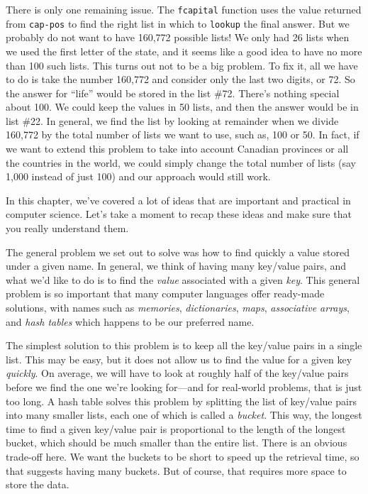 There is only one remaining issue.  The \texttt{fcapital} function uses the
value returned from \texttt{cap-pos} to find the right list in which to
\texttt{lookup} the final answer. But we probably do not want to have 
160,772 possible lists! We only had 26 lists when we used the first letter
of the state, and it seems like a good idea to have no more than 100
such lists. This turns out not to be a big problem. To fix it, all we
have to do is take the number 160,772 and consider only the last two digits,
or 72. So the answer for ``life'' would be stored in the list \#72. There's
nothing special about 100. We could keep the values in 50 lists, and then
the answer would be in list \#22. In general, we find the list by looking at
remainder when we divide 160,772 by the total number of lists we want to use,
such as, 100 or 50. In fact, if we want to extend this problem to take into
account Canadian provinces or all the countries in the world, we could simply
change the total number of lists (say 1,000 instead of just 100) and our
approach would still work.

In this chapter, we've covered a lot of ideas that are important and practical
in computer science. Let's take a moment to recap these ideas and make sure
that you really understand them.

The general problem we set out to solve was how to find quickly a value
stored under a given name. In general, we think of having many key/value pairs,
and what we'd like to do is to find the \emph{value} associated with a given 
\emph{key}. This general problem is so important that many computer languages
offer ready-made solutions, with names such as \emph{memories}, \emph{dictionaries}, 
\emph{maps}, \emph{associative arrays}, and \emph{hash tables} which happens to 
be our preferred name.

The simplest solution to this problem is to keep all the key/value pairs in a 
single list. This may be easy, but it does not allow us to find the value for
a given key \emph{quickly}. On average, we will have to look at roughly half
of the key/value pairs before we find the one we're looking for---and for
real-world problems, that is just too long. A hash table solves this problem
by splitting the list of key/value pairs into many smaller lists, each one of
which is called a \emph{bucket}. This way, the longest time to find a given 
key/value pair is proportional to the length of the longest bucket, which 
should be much smaller than the entire list. There is an obvious trade-off 
here. We want the buckets to be short to speed up the retrieval time, so that
suggests having many buckets. But of course, that requires more space to store 
the data.

